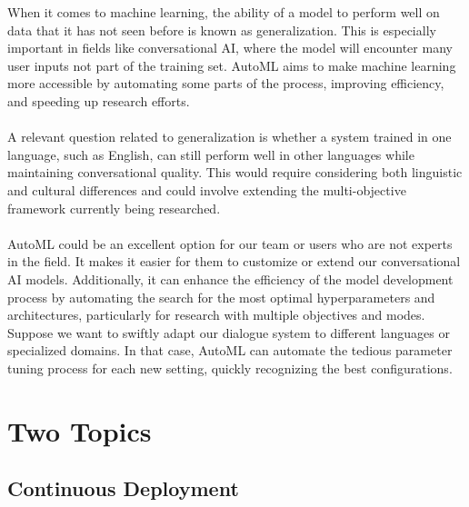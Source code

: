 \documentclass[11pt]{article}
\begin{document}
When it comes to machine learning, the ability of a model to perform well on data that it has not seen before is known as generalization. This is especially important in fields like conversational AI, where the model will encounter many user inputs not part of the training set. AutoML aims to make machine learning more accessible by automating some parts of the process, improving efficiency, and speeding up research efforts. \\\\
A relevant question related to generalization is whether a system trained in one language, such as English, can still perform well in other languages while maintaining conversational quality. This would require considering both linguistic and cultural differences and could involve extending the multi-objective framework currently being researched.\\\\
AutoML could be an excellent option for our team or users who are not experts in the field. It makes it easier for them to customize or extend our conversational AI models. Additionally, it can enhance the efficiency of the model development process by automating the search for the most optimal hyperparameters and architectures, particularly for research with multiple objectives and modes. Suppose we want to swiftly adapt our dialogue system to different languages or specialized domains. In that case, AutoML can automate the tedious parameter tuning process for each new setting, quickly recognizing the best configurations.

\section{Two Topics}

\subsection{Continuous Deployment}
\end{document}
